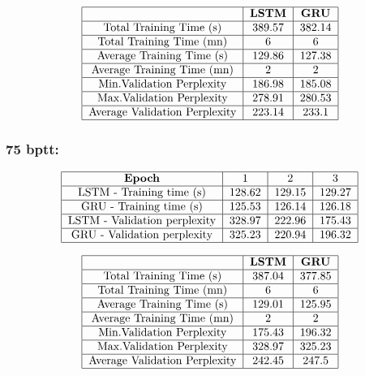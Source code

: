 \documentclass[11pt]{article}
\newcommand{\0}{\mat{0}}
\begin{document}
\begin{itemize}
\begin{enumerate}
	  \[
  	 	\begin{tabular}{| c | c | c |}
  	 	 	\hline
	 	 		& \textbf{LSTM} &  \textbf{GRU} \\
	  	 	\hline
	 			Total Training Time (s)		& 389.57 & 382.14\\
	 	 	\hline
				Total Training Time (mn)		& 6 & 6 \\
			\hline 
				Average Training Time (s)	 	& 129.86 & 127.38 \\
			\hline 
				Average Training Time (mn)	& 2 & 2 \\
			\hline
				Min.Validation Perplexity		& 186.98 & 185.08 \\
			\hline
				Max.Validation Perplexity		& 278.91 & 280.53 \\
			\hline
				Average Validation Perplexity	& 223.14 & 233.1 \\
			\hline
		\end{tabular}
	\] 


	\subsubsection*{\textbf{75 bptt:}}
	  \[
  	 	\begin{tabular}{| c | c | c | c |}
  	 	 	\hline
	 	 		\textbf{Epoch} & 1 & 2 & 3  \\
	  	 	\hline
	 			LSTM - Training time (s)		& 128.62 & 129.15 & 129.27 \\
	 	 	\hline
				GRU - Training time (s)		& 125.53 & 126.14 & 126.18 \\
			\hline 
				LSTM - Validation perplexity	& 328.97 & 222.96 & 175.43 \\
			\hline 
				GRU - Validation perplexity	& 325.23 & 220.94 & 196.32 \\
			\hline
		\end{tabular}
	\] 

	  \[
  	 	\begin{tabular}{| c | c | c |}
  	 	 	\hline
	 	 		& \textbf{LSTM} &  \textbf{GRU} \\
	  	 	\hline
	 			Total Training Time (s)		& 387.04 & 377.85 \\
	 	 	\hline
				Total Training Time (mn)		& 6 & 6 \\
			\hline 
				Average Training Time (s)	 	& 129.01 & 125.95 \\
			\hline 
				Average Training Time (mn)	& 2 & 2 \\
			\hline
				Min.Validation Perplexity		& 175.43 & 196.32 \\
			\hline
				Max.Validation Perplexity		& 328.97 & 325.23 \\
			\hline
				Average Validation Perplexity	& 242.45 & 247.5 \\
			\hline
		\end{tabular}
	\] 


\end{enumerate}
\end{itemize}
\end{document}
